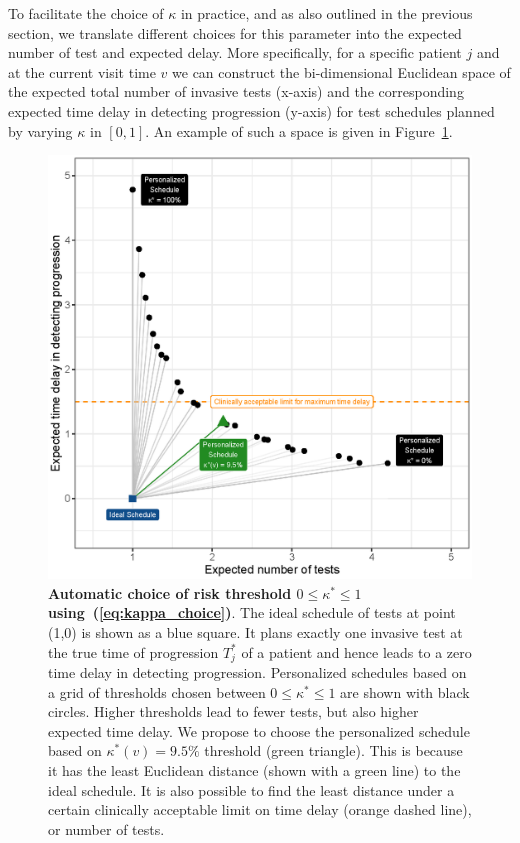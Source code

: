 To facilitate the choice of $\kappa$ in practice, and as also outlined in the previous section, we translate different choices for this parameter into the expected number of test and expected delay. More specifically, for a specific patient $j$ and at the current visit time $v$ we can construct the bi-dimensional Euclidean space of the expected total number of invasive tests (x-axis) and the corresponding expected time delay in detecting progression (y-axis) for test schedules planned by varying $\kappa$ in $[0, 1]$. An example of such a space is given in Figure~\ref{fig:kappa_choice}.
\begin{figure}
\centerline{\includegraphics{images/kappa_choice_102.eps}}
\caption{\textbf{Automatic choice of risk threshold $0 \leq \kappa^* \leq 1$ using~(\ref{eq:kappa_choice})}. The ideal schedule of tests at point (1,0) is shown as a blue square. It plans exactly one invasive test at the true time of progression $T^*_j$ of a patient and hence leads to a zero time delay in detecting progression. Personalized schedules based on a grid of thresholds chosen between $0 \leq \kappa^* \leq 1$ are shown with black circles. Higher thresholds lead to fewer tests, but also higher expected time delay. We propose to choose the personalized schedule based on $\kappa^*(v)=9.5\%$ threshold (green triangle). This is because it has the least Euclidean distance (shown with a green line) to the ideal schedule. It is also possible to find the least distance under a certain clinically acceptable limit on time delay (orange dashed line), or number of tests.}
\label{fig:kappa_choice}
\end{figure}
